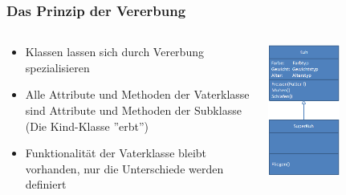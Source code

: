 \begin{frame}
\frametitle{Das Prinzip der Vererbung}
\begin{columns}
	\begin{column}{.5\textwidth}
		\small
		\begin{itemize} 
		  	\item Klassen lassen sich durch Vererbung spezialisieren
		  	\item Alle Attribute und Methoden der Vaterklasse sind
			  	  Attribute und Methoden der Subklasse \\ (Die Kind-Klasse
			  	  ''erbt'')
		  	\item Funktionalit\"at der Vaterklasse bleibt vorhanden, nur die
		  		  Unterschiede werden definiert
		\end{itemize}
	\end{column}
 	\begin{column}{.5\textwidth} 
		\center
		\includegraphics[width=0.5\textwidth, 
		keepaspectratio=true]{bilder/vererbung_kuh.png} 
	\end{column}
\end{columns}
\end{frame}

